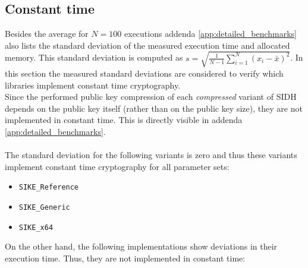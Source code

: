 \subsection{Constant time}\label{sec:analysis_security_time}
Besides the average for $N=100$ executions addenda \ref{app:detailed_benchmarks} also lists the standard deviation of the measured execution time and allocated memory. This standard deviation is computed as $s=\sqrt{\frac{1}{N-1}\sum_{i=1}^N(x_i-\bar{x})^2}$. In this section the measured standard deviations are considered to verify which libraries implement constant time cryptography.\\
Since the performed public key compression of each \textit{compressed} variant of \gls{SIDH} depends on the public key itself (rather than on the public key size), they are not implemented in constant time. This is directly visible in  addenda \ref{app:detailed_benchmarks}.\\\\
The standard deviation for the following variants is zero and thus these variants implement constant time cryptography for all parameter sets:
\begin{itemize}
\item \texttt{SIKE\_Reference}
\item \texttt{SIKE\_Generic} 
\item \texttt{SIKE\_x64}
\end{itemize}
On the other hand, the following implementations show deviations in their execution time. Thus, they are not implemented in constant time:

